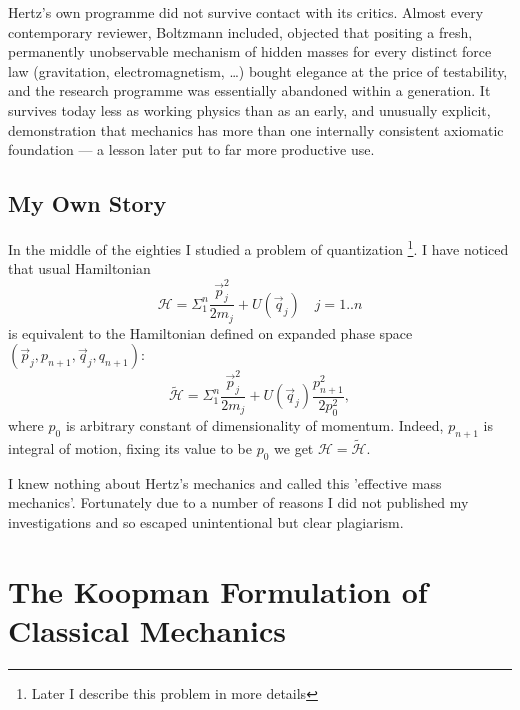 Hertz's own programme did not survive contact with its critics.
Almost every contemporary reviewer, Boltzmann included, objected
that positing a fresh, permanently unobservable mechanism of hidden
masses for every distinct force law (gravitation, electromagnetism,
\ldots) bought elegance at the price of testability, and the
research programme was essentially abandoned within a generation. It
survives today less as working physics than as an early, and
unusually explicit, demonstration that mechanics has more than one
internally consistent axiomatic foundation --- a lesson later put to
far more productive use.

\subsection{My Own Story}

In the middle of the eighties I studied a problem of quantization
\footnote{Later I describe this problem in more details}.
I have noticed that usual Hamiltonian
\[\mathcal{H}=\Sigma_1^n \frac{\vec p_j^2}{2 m_j} + U(\vec q_j) \quad j=1..n\]
is equivalent to the Hamiltonian defined on expanded phase space 
$(\vec p_j,p_{n+1},\vec q_j,q_{n+1})$:
\begin{equation}
   \label {lnf:hext}
    \mathcal{\tilde H}=\Sigma_1^n \frac{\vec p_j^2}{2 m_j} + U(\vec q_j) \frac{p_{n+1}^2}{2 p_0^2},
\end{equation}
where $p_0$ is arbitrary constant of dimensionality of momentum. 
Indeed, $p_{n+1}$ is integral of motion, fixing its value to be $p_0$ 
we get $ \mathcal{H}=\mathcal{\tilde H}$.

I knew nothing about Hertz's mechanics and called this 'effective mass 
mechanics'. Fortunately due to a number of reasons I did not published
my investigations and so escaped unintentional but clear plagiarism.


\section{The Koopman Formulation of Classical Mechanics}
\label{lnf:koop}

\newcommand{\PB}[2]{\{#1,#2\}} 
\newcommand{\CL}{\widehat{\mathcal{L}}}

